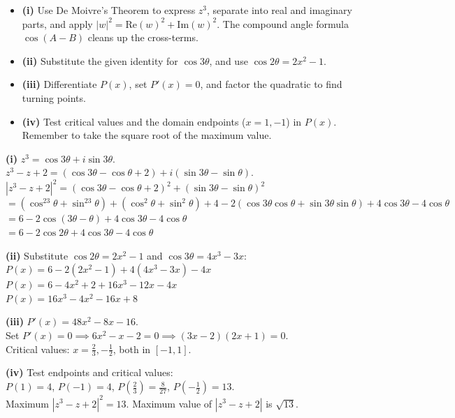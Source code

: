 \begin{hint}
\begin{itemize}[leftmargin=*]
    \item \textbf{(i)} Use De Moivre's Theorem to express $z^3$, separate into real and imaginary parts, and apply $|w|^2 = \text{Re}(w)^2 + \text{Im}(w)^2$. The compound angle formula $\cos(A-B)$ cleans up the cross-terms.
    \item \textbf{(ii)} Substitute the given identity for $\cos3\theta$, and use $\cos2\theta = 2x^2 - 1$.
    \item \textbf{(iii)} Differentiate $P(x)$, set $P'(x) = 0$, and factor the quadratic to find turning points.
    \item \textbf{(iv)} Test critical values and the domain endpoints ($x = 1, -1$) in $P(x)$. Remember to take the square root of the maximum value.
\end{itemize}
\end{hint}

\begin{solution}[Sketch]
\textbf{(i)} $z^3 = \cos3\theta + i\sin3\theta$. \\
$z^3 - z + 2 = (\cos3\theta - \cos\theta + 2) + i(\sin3\theta - \sin\theta)$. \\
$|z^3 - z + 2|^2 = (\cos3\theta - \cos\theta + 2)^2 + (\sin3\theta - \sin\theta)^2$ \\
$= (\cos^23\theta + \sin^23\theta) + (\cos^2\theta + \sin^2\theta) + 4 - 2(\cos3\theta\cos\theta + \sin3\theta\sin\theta) + 4\cos3\theta - 4\cos\theta$ \\
$= 6 - 2\cos(3\theta - \theta) + 4\cos3\theta - 4\cos\theta$ \\
$= 6 - 2\cos2\theta + 4\cos3\theta - 4\cos\theta$

\textbf{(ii)} Substitute $\cos2\theta = 2x^2 - 1$ and $\cos3\theta = 4x^3 - 3x$: \\
$P(x) = 6 - 2(2x^2 - 1) + 4(4x^3 - 3x) - 4x$ \\
$P(x) = 6 - 4x^2 + 2 + 16x^3 - 12x - 4x$ \\
$P(x) = 16x^3 - 4x^2 - 16x + 8$

\textbf{(iii)} $P'(x) = 48x^2 - 8x - 16$. \\
Set $P'(x) = 0 \implies 6x^2 - x - 2 = 0 \implies (3x - 2)(2x + 1) = 0$. \\
Critical values: $x = \frac{2}{3}, -\frac{1}{2}$, both in $[-1, 1]$.

\textbf{(iv)} Test endpoints and critical values: \\
$P(1) = 4$, $P(-1) = 4$, $P\left(\frac{2}{3}\right) = \frac{8}{27}$, $P\left(-\frac{1}{2}\right) = 13$. \\
Maximum $|z^3 - z + 2|^2 = 13$. Maximum value of $|z^3 - z + 2|$ is $\sqrt{13}$.
\end{solution}

